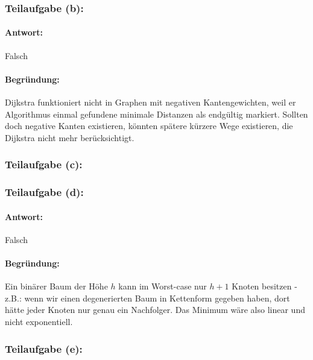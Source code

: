 \documentclass[a4paper,twoside,12pt]{article}
\begin{document}
\begin{description}
\subsubsection*{Teilaufgabe (b):}
\paragraph{Antwort:} Falsch
\paragraph{Begründung:} Dijkstra funktioniert nicht in Graphen mit negativen Kantengewichten, weil er Algorithmus einmal gefundene minimale Distanzen als endgültig markiert. Sollten doch negative Kanten existieren, könnten spätere kürzere Wege existieren, die Dijkstra nicht mehr berücksichtigt.

\subsubsection*{Teilaufgabe (c):}

\subsubsection*{Teilaufgabe (d):}
\paragraph{Antwort:} Falsch
\paragraph{Begründung:} Ein binärer Baum der Höhe $h$ kann im Worst-case nur $h+1$ Knoten besitzen - z.B.: wenn wir einen degenerierten Baum in Kettenform gegeben haben, dort hätte jeder Knoten nur genau ein Nachfolger. Das Minimum wäre also linear und nicht exponentiell.

\subsubsection*{Teilaufgabe (e):}

\end{description}
\end{document}
